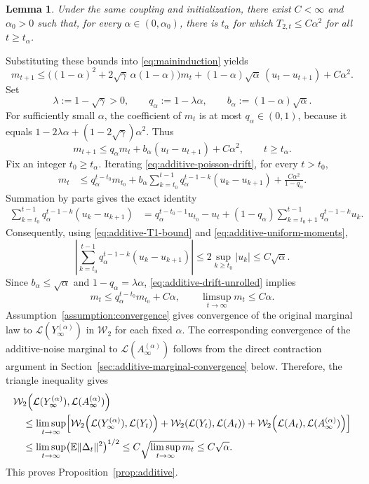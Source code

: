 \documentclass[11pt,letterpaper]{article}
\theoremstyle{plain}
\newtheorem{lemma}{Lemma}
\theoremstyle{definition}
\theoremstyle{remark}
\newcommand{\E}{\mathbb{E}}
\newcommand{\W}{\mathcal{W}}
\newcommand{\law}{\mathcal{L}}
\begin{document}
\begin{lemma}
\label{lem:additiveT2}
Under the same coupling and initialization, there exist
$C<\infty$ and $\alpha_0>0$ such that, for every
$\alpha\in(0,\alpha_0)$, there is $t_\alpha$ for which
$T_{2,t}\leq C\alpha^2$ for all $t\geq t_\alpha$.
\end{lemma}

Substituting these bounds into \eqref{eq:maininduction} yields
\[
    m_{t+1}
    \leq\bigl((1-\alpha)^2+2\sqrt\gamma\,\alpha(1-\alpha)\bigr)m_t
        +(1-\alpha)\sqrt\alpha\,(u_t-u_{t+1})+C\alpha^2.
\]
Set
\[
    \lambda:=1-\sqrt\gamma>0,
    \qquad q_\alpha:=1-\lambda\alpha,
    \qquad b_\alpha:=(1-\alpha)\sqrt\alpha.
\]
For sufficiently small $\alpha$, the coefficient of $m_t$ is at most
$q_\alpha\in(0,1)$, because it equals
$1-2\lambda\alpha+(1-2\sqrt\gamma)\alpha^2$. Thus
\begin{equation}
\label{eq:additive-poisson-drift}
    m_{t+1}\leq q_\alpha m_t+b_\alpha(u_t-u_{t+1})+C\alpha^2,
    \qquad t\geq t_\alpha.
\end{equation}
Fix an integer $t_0\geq t_\alpha$. Iterating
\eqref{eq:additive-poisson-drift}, for every $t>t_0$,
\begin{align}
    m_t
    &\leq q_\alpha^{t-t_0}m_{t_0}
        +b_\alpha\sum_{k=t_0}^{t-1}
            q_\alpha^{t-1-k}(u_k-u_{k+1})
        +\frac{C\alpha^2}{1-q_\alpha}.
    \label{eq:additive-drift-unrolled}
\end{align}
Summation by parts gives the exact identity
\begin{align*}
    \sum_{k=t_0}^{t-1}q_\alpha^{t-1-k}(u_k-u_{k+1})
    &=q_\alpha^{t-t_0-1}u_{t_0}-u_t
      +(1-q_\alpha)\sum_{k=t_0+1}^{t-1}q_\alpha^{t-1-k}u_k.
\end{align*}
Consequently, using \eqref{eq:additive-T1-bound} and
\eqref{eq:additive-uniform-moments},
\[
    \left|\sum_{k=t_0}^{t-1}
        q_\alpha^{t-1-k}(u_k-u_{k+1})\right|
    \leq2\sup_{k\geq t_0}|u_k|
    \leq C\sqrt\alpha.
\]
Since $b_\alpha\leq\sqrt\alpha$ and
$1-q_\alpha=\lambda\alpha$, \eqref{eq:additive-drift-unrolled} implies
\[
    m_t\leq q_\alpha^{t-t_0}m_{t_0}+C\alpha,
    \qquad
    \limsup_{t\to\infty}m_t\leq C\alpha.
\]
Assumption~\ref{assumption:convergence} gives convergence of the original
marginal law to $\law(Y_\infty^{(\alpha)})$ in $\W_2$ for each fixed
$\alpha$. The corresponding convergence of the additive-noise marginal
to $\law(A_\infty^{(\alpha)})$ follows from the direct contraction
argument in Section~\ref{sec:additive-marginal-convergence} below.
Therefore, the triangle inequality gives
\begin{align*}
    &\W_2\!\left(\law(Y_\infty^{(\alpha)}),
                  \law(A_\infty^{(\alpha)})\right)\\
    &\quad\leq\limsup_{t\to\infty}\Bigl[
        \W_2\!\left(\law(Y_\infty^{(\alpha)}),\law(Y_t)\right)
        +\W_2\!\left(\law(Y_t),\law(A_t)\right)
        +\W_2\!\left(\law(A_t),\law(A_\infty^{(\alpha)})\right)
    \Bigr]\\
    &\quad\leq\limsup_{t\to\infty}
        \bigl(\E\|\Delta_t\|^2\bigr)^{1/2}
    \leq C\sqrt{\limsup_{t\to\infty}m_t}
    \leq C\sqrt\alpha.
\end{align*}
This proves Proposition~\ref{prop:additive}.
\end{document}
